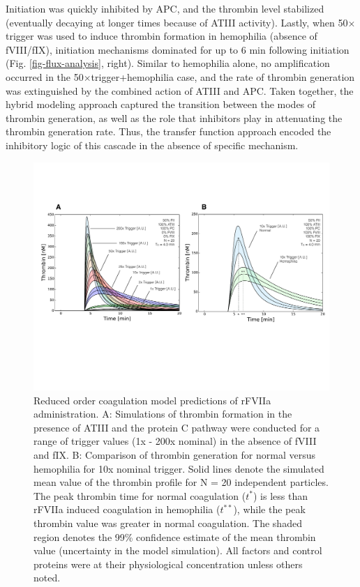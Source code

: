\documentclass[processes,article,received,moreauthors,pdftex,12pt,a4paper]{mdpi}
\begin{document}
Initiation was quickly inhibited by APC, and the thrombin level stabilized (eventually decaying at longer times because of ATIII activity). 
Lastly, when 50$\times$trigger was used to induce thrombin formation in hemophilia (absence of fVIII/fIX), 
initiation mechanisms dominated for up to 6 min following initiation (Fig. \ref{fig-flux-analysis}, right). 
Similar to hemophilia alone, no amplification occurred in the 50$\times$trigger+hemophilia case, 
and the rate of thrombin generation was extinguished by the combined action of ATIII and APC. 
Taken together, the hybrid modeling approach captured the transition between the modes of thrombin generation, as well as the role that inhibitors play 
in attenuating the thrombin generation rate. Thus, the transfer function approach encoded the inhibitory logic of this cascade in the absence of specific mechanism.  

\begin{figure}[H]
\centering
\includegraphics[width=1.0\textwidth]{./figs/Figure-7-rFVIIa-Trigger.pdf}
\caption{Reduced order coagulation model predictions of rFVIIa administration. 
A: Simulations of thrombin formation in the presence of ATIII and the protein C pathway were conducted for a range of trigger values (1x - 200x nominal) in the absence of fVIII and fIX.
B: Comparison of thrombin generation for normal versus hemophilia for 10x nominal trigger.
Solid lines denote the simulated mean value of the thrombin profile for N = 20 independent particles. 
The peak thrombin time for normal coagulation ($t^{*}$) is less than rFVIIa induced coagulation in hemophilia ($t^{**}$), while the peak thrombin value was greater in normal coagulation.
The shaded region denotes the 99\% confidence estimate of the mean thrombin value (uncertainty in the model simulation). 
All factors and control proteins were at their physiological concentration unless others noted.}\label{fig-rFVII}
\end{figure}
\end{document}
